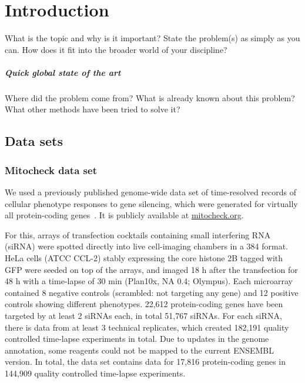 \chapter{Introduction}
What is the topic and why is it important? State the problem(s) as simply as you can. How does it fit into the broader world of your discipline? 
\paragraph*{Quick global state of the art}
Where did the problem come from? What is already known about this problem? What other methods have been tried to solve it? 

\section{Data sets}
\subsection{Mitocheck data set}

We used a previously published genome-wide data set of time-resolved
records of cellular phenotype responses to gene silencing, which
were generated for virtually all protein-coding genes~\cite{pmid20360735}. It is publicly available at
\href{http://www.mitocheck.org}{mitocheck.org}. 

For this, arrays of transfection cocktails containing small interfering RNA (siRNA) were spotted directly into live cell-imaging chambers in a 384 format. HeLa cells (ATCC\up{\textregistered} CCL-2\texttrademark) stably expressing the core histone 2B tagged with GFP were seeded on top of the arrays, and imaged 18 h after the transfection for 48 h with a time-lapse of 30 min (Plan10x, NA 0.4; Olympus). Each microarray contained 8 negative controls (scrambled: not targeting any gene) and 12 positive controls showing different phenotypes. 
22,612 protein-coding genes have been targeted by at least 2 siRNAs each, in total 51,767 siRNAs. For each siRNA, there is data from at least 3 technical replicates, which created 182,191 quality controlled time-lapse experiments in total. Due to updates in the genome annotation, some reagents could not be mapped to the current ENSEMBL version. In total, the data set contains data for 17,816 protein-coding genes in 144,909 quality controlled time-lapse
experiments.  

